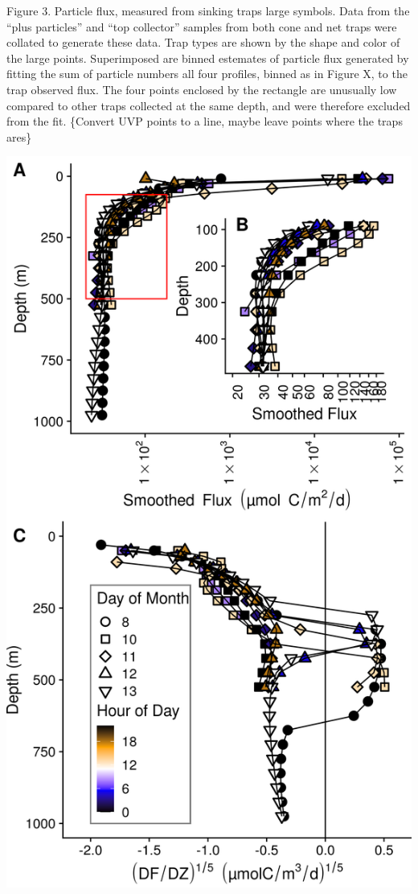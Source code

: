 \documentclass[]{article}
\begin{document}
Figure 3. Particle flux, measured from sinking traps large symbols. Data
from the ``plus particles'' and ``top collector'' samples from both cone
and net traps were collated to generate these data. Trap types are shown
by the shape and color of the large points. Superimposed are binned
estemates of particle flux generated by fitting the sum of particle
numbers all four profiles, binned as in Figure X, to the trap observed
flux. The four points enclosed by the rectangle are unusually low
compared to other traps collected at the same depth, and were therefore
excluded from the fit. \{Convert UVP points to a line, maybe leave
points where the traps ares\}

\includegraphics{../figures/FluxDeepDive.png}
\end{document}
